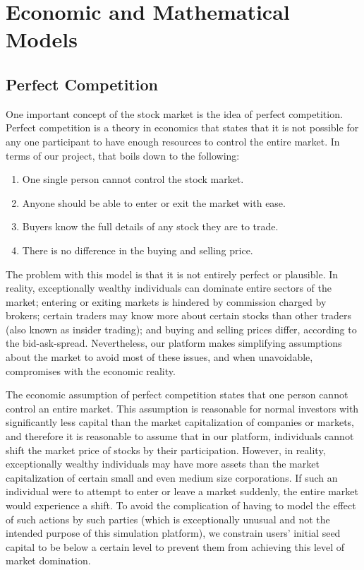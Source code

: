 \section{Economic and Mathematical Models}
\label{econmodels}
\subsection{Perfect Competition}

One important concept of the stock market is the idea of perfect competition. Perfect competition is a theory in economics that states that it is not possible for any one participant to have enough resources to control the entire market. In terms of our project, that boils down to the following:
\begin{enumerate}
\item
One single person cannot control the stock market.\cite{inv:pcomp} 
\item
Anyone should be able to enter or exit the market with ease.
\item
Buyers know the full details of any stock they are to trade.
\item
There is no difference in the buying and selling price.\cite{wiki:pcomp}
\end{enumerate}
The problem with this model is that it is not entirely perfect or plausible. In reality, exceptionally wealthy individuals can dominate entire sectors of the market; entering or exiting markets is hindered by commission charged by brokers; certain traders may know more about certain stocks than other traders (also known as insider trading); and buying and selling prices differ, according to the bid-ask-spread. Nevertheless, our platform makes simplifying assumptions about the market to avoid most of these issues, and when unavoidable, compromises with the economic reality.

The economic assumption of perfect competition states that one person cannot control an entire market. This assumption is reasonable for normal investors with significantly less capital than the market capitalization of companies or markets, and therefore it is reasonable to assume that in our platform, individuals cannot shift the market price of stocks by their participation. However, in reality, exceptionally wealthy individuals may have more assets than the market capitalization of certain small and even medium size corporations. If such an individual were to attempt to enter or leave a market suddenly, the entire market would experience a shift. To avoid the complication of having to model the effect of such actions by such parties (which is exceptionally unusual and not the intended purpose of this simulation platform), we constrain users' initial seed capital to be below a certain level to prevent them from achieving this level of market domination.

